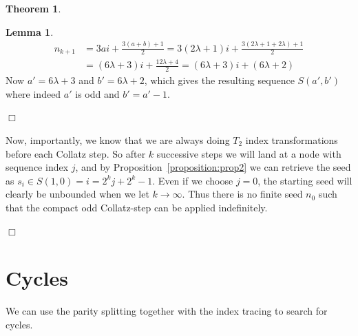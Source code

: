 \documentclass{article}
\theoremstyle{definition}
\newtheorem{theorem}{Theorem}[section]
\newtheorem{lemma}{Lemma}[section]
\begin{document}
\begin{theorem}
\begin{lemma}
\begin{equation*}
\begin{split}
    n_{k+1} &= 3ai + \frac{3(a+b)+1}{2} = 3(2\lambda+1)i + \frac{3(2\lambda+1+2\lambda)+1}{2}\\
    &= (6\lambda+3)i + \frac{12\lambda+4}{2} = (6\lambda+3)i + (6\lambda+2)
\end{split}
\end{equation*}
Now $a'=6\lambda+3$ and $b'=6\lambda+2$, which gives the resulting sequence $S(a',b')$ where indeed $a'$ is odd and $b'=a'-1$.
\end{lemma}
\begin{flushright}
$\Box$
\end{flushright}
Now, importantly, we know that we are always doing $T_2$ index transformations before each Collatz step. So after $k$ successive steps we will land at a node with sequence index $j$, and by Proposition~\ref{proposition:prop2} we can retrieve the seed as $s_i\in S(1,0) = i = 2^kj + 2^k -1$. Even if we choose $j=0$, the starting seed will clearly be unbounded when we let $k\longrightarrow\infty$. Thus there is no finite seed $n_0$ such that the compact odd Collatz-step can be applied indefinitely.
\begin{flushright}
$\Box$
\end{flushright}
\end{theorem}

\section{Cycles}\label{sec:cycles}
We can use the parity splitting together with the index tracing to search for cycles.
\end{document}
